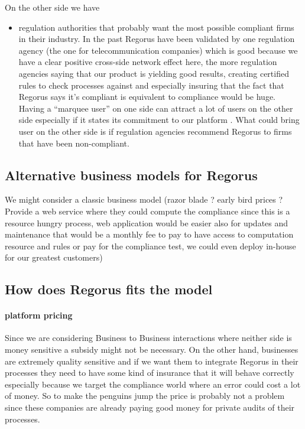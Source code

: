 \documentclass[10pt]{report}
\begin{document}
On the other side we have
\begin{itemize}
\item regulation authorities that probably want the most possible compliant firms in their industry. In the past Regorus have been validated by one regulation agency (the one for telecommunication companies) which is good because we have a clear positive cross-side network effect here, the more regulation agencies saying that our product is yielding good results, creating certified rules to check processes against and especially insuring that the fact that Regorus says it's compliant is equivalent to compliance would be huge. Having a \enquote{marquee user} on one side can attract a lot of users on the other side especially if it states its commitment to our platform \autocite{eisenmann2006strategies}. What could bring user on the other side is if regulation agencies recommend Regorus to firms that have been non-compliant. 
\end{itemize}



\subsection{Alternative business models for Regorus}
We might consider a classic business model (razor blade ? early bird prices ? Provide a web service where they could compute the compliance since this is a resource hungry process, web application would be easier also for updates and maintenance that would be a monthly fee to pay to have access to computation resource and rules or pay for the compliance test, we could even deploy in-house for our greatest customers)


\subsection{How does Regorus fits the model}
\paragraph{platform pricing} Since we are considering Business to Business interactions where neither side is money sensitive a subsidy might not be necessary. On the other hand, businesses are extremely quality sensitive and if we want them to integrate Regorus in their processes they need to have some kind of insurance that it will behave correctly especially because we target the compliance world where an error could cost a lot of money. So to make the penguins jump the price is probably not a problem since these companies are already paying good money for private audits of their processes.
\end{document}
